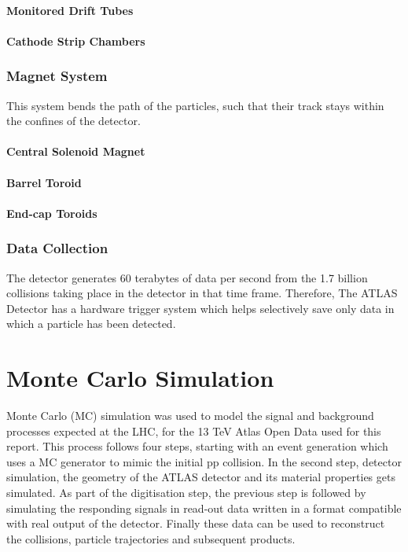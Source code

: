 \documentclass[12pt,a4paper]{article}
\begin{document}
\paragraph{Monitored Drift Tubes}
\paragraph{Cathode Strip Chambers}

\subsubsection{Magnet System}
This system bends the path of the particles, such that their track stays within
the confines of the detector.

\paragraph{Central Solenoid Magnet}
\paragraph{Barrel Toroid}
\paragraph{End-cap Toroids}

\subsubsection{Data Collection}
The detector generates 60 terabytes of data per second from the 1.7 billion
collisions taking place in the detector in that time frame. Therefore, The ATLAS
Detector has a hardware trigger system which helps selectively save only data in
which a particle has been detected.


\section{Monte Carlo Simulation}
Monte Carlo (MC) simulation was used to model the signal and background
processes expected at the LHC, for the 13 TeV Atlas Open Data used for this
report. This process follows four steps, starting with an event generation which
uses a MC generator to mimic the initial pp collision. In the second step,
detector simulation, the geometry of the ATLAS detector and its material
properties gets simulated. As part of the digitisation step, the previous step
is followed by simulating the responding signals in read-out data written in a
format compatible with real output of the detector. Finally these data can be
used to reconstruct the collisions, particle trajectories and subsequent products.\\
\end{document}
